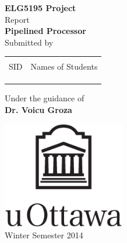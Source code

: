 \begin{titlepage}

\begin{center}

\textup{\small {\bf ELG5195 Project} \\ Report}\\[0.2in]

\Large \textbf {Pipelined Processor}\\[0.5in]

\normalsize Submitted by \\
\begin{table}[h]
\centering
\begin{tabular}{lr}\hline \\
SID & Names of Students \\ \\ \hline
\\
\\ \hline
\end{tabular}
\end{table}

\vspace{.1in}
Under the guidance of\\
{\textbf{Dr. Voicu Groza}}\\[0.2in]

\vfill

\includegraphics[width=0.4\textwidth]{UO}\\[0.1in]
\vspace{0.2cm}
Winter Semester 2014

\end{center}

\end{titlepage}
